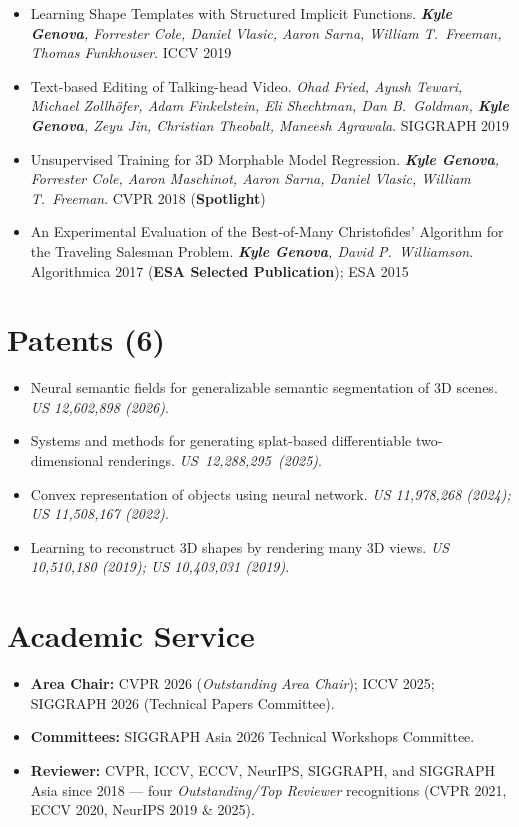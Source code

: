 \documentclass[10.5pt]{article}
\newcommand{\me}{\textbf{Kyle Genova}}
\newcommand{\pub}[3]{\item #1. \textit{#2}. #3}
\begin{document}
\begin{itemize}
  \pub{Learning Shape Templates with Structured Implicit Functions}{\me, Forrester Cole, Daniel Vlasic, Aaron Sarna, William T.\ Freeman, Thomas Funkhouser}{ICCV 2019}
  \pub{Text-based Editing of Talking-head Video}{Ohad Fried, Ayush Tewari, Michael Zollh\"ofer, Adam Finkelstein, Eli Shechtman, Dan B.\ Goldman, \me, Zeyu Jin, Christian Theobalt, Maneesh Agrawala}{SIGGRAPH 2019}
  \pub{Unsupervised Training for 3D Morphable Model Regression}{\me, Forrester Cole, Aaron Maschinot, Aaron Sarna, Daniel Vlasic, William T.\ Freeman}{CVPR 2018 (\textbf{Spotlight})}
  \pub{An Experimental Evaluation of the Best-of-Many Christofides' Algorithm for the Traveling Salesman Problem}{\me, David P.\ Williamson}{Algorithmica 2017 (\textbf{ESA Selected Publication}); ESA 2015}
\end{itemize}

\section{Patents (6)}

\begin{itemize}
  \item Neural semantic fields for generalizable semantic segmentation of 3D scenes. \textit{US 12,602,898 (2026)}.
  \item Systems and methods for generating splat-based differentiable two-dimensional renderings. \textit{US~12,288,295~(2025)}.
  \item Convex representation of objects using neural network. \textit{US 11,978,268 (2024); US 11,508,167 (2022)}.
  \item Learning to reconstruct 3D shapes by rendering many 3D views. \textit{US 10,510,180 (2019); US 10,403,031 (2019)}.
\end{itemize}

\section{Academic Service}

\begin{itemize}
  \item \textbf{Area Chair:} CVPR 2026 (\textit{Outstanding Area Chair}); ICCV 2025; SIGGRAPH 2026 (Technical Papers Committee).
  \item \textbf{Committees:} SIGGRAPH Asia 2026 Technical Workshops Committee.
  \item \textbf{Reviewer:} CVPR, ICCV, ECCV, NeurIPS, SIGGRAPH, and SIGGRAPH Asia since 2018 --- four \textit{Outstanding/Top Reviewer} recognitions (CVPR 2021, ECCV 2020, NeurIPS 2019 \& 2025).
\end{itemize}
\end{document}

